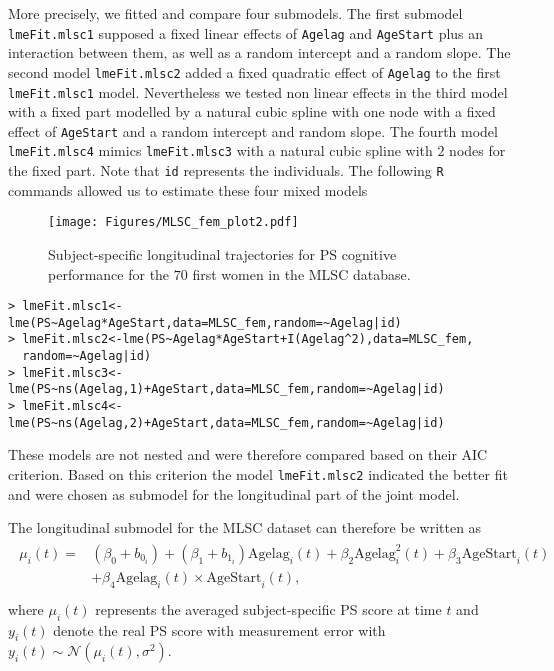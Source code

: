 \documentclass[12pt]{article}
\begin{document}
More precisely, we fitted and compare four submodels. The first submodel \texttt{lmeFit.mlsc1} supposed a fixed linear effects of \texttt{Agelag} and \texttt{AgeStart} plus an interaction between them, as well as a random intercept and a random slope. The second model \texttt{lmeFit.mlsc2} added a fixed quadratic effect of \texttt{Agelag} to the first \texttt{lmeFit.mlsc1} model. Nevertheless we tested non linear effects in the third model with a fixed part modelled by a natural cubic spline with one node with a fixed effect of \texttt{AgeStart} and a random intercept and random slope. The fourth model \texttt{lmeFit.mlsc4} mimics \texttt{lmeFit.mlsc3} with a natural cubic spline with $2$ nodes for the fixed part. Note that \texttt{id} represents the individuals. The following \texttt{R} commands allowed us to estimate these four mixed models
\begin{figure}[!tb]
\centering
\texttt{[image: Figures/MLSC\_fem\_plot2.pdf]}
\caption{Subject-specific longitudinal trajectories for PS cognitive performance for the $70$ first women in the MLSC database.}
\label{MLSCid_plot}
\end{figure}
\begin{verbatim}
> lmeFit.mlsc1<-lme(PS~Agelag*AgeStart,data=MLSC_fem,random=~Agelag|id)
> lmeFit.mlsc2<-lme(PS~Agelag*AgeStart+I(Agelag^2),data=MLSC_fem,
  random=~Agelag|id)
> lmeFit.mlsc3<-lme(PS~ns(Agelag,1)+AgeStart,data=MLSC_fem,random=~Agelag|id)
> lmeFit.mlsc4<-lme(PS~ns(Agelag,2)+AgeStart,data=MLSC_fem,random=~Agelag|id)
\end{verbatim}
These models are not nested and were therefore compared based on their AIC criterion. Based on this criterion the model \texttt{lmeFit.mlsc2} indicated the better fit and were chosen as submodel for the longitudinal part of the joint model.

The longitudinal submodel for the MLSC dataset can therefore be written as
\begin{equation}
\begin{split}
\begin{aligned}
\mu_i(t) = &(\beta_0 +b_{0_{i}} )+(\beta_1+b_{1_{i}} )\text{Agelag}_i(t)+\beta_2 \text{Agelag}_i^2(t)+\beta_3 \text{AgeStart}_i(t) \\
&+\beta_4 \text{Agelag}_i(t) \times \text{AgeStart}_i(t),\\
\end{aligned}
\end{split}
\label{MLSC_Longitudinal model}
\end{equation}
where $\mu_i(t)$ represents the averaged subject-specific PS score at time $t$ and $y_{i}(t)$ denote the real PS score with measurement error with $y_{i}(t) \sim \mathcal{N}(\mu_i(t), \sigma^{2}) $.
\end{document}
